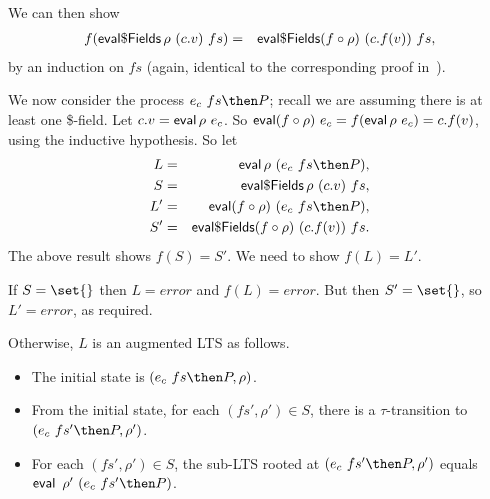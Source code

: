 We can then  show
\begin{eqnarray*} %
f (\evalDollarFields \rho~(c.v)~fs) & = & 
  \evalDollarFields (f\after\rho)~(c.f(v))~fs ,
\end{eqnarray*}
%
by an induction on $fs$ (again, identical to the corresponding proof
in~\cite{symmetry-reduction}).

We now consider the process $e_c~ fs \then P$; recall we are assuming there is
at least one \$-field.  Let $c.v = \mathop{\sf eval} \rho~e_c$.  So $\mathop{\sf eval}
(f\circ\rho)~e_c = f (\mathop{\sf eval} \rho~e_c) = c.f(v)$, using the inductive
hypothesis.  So let
\begin{eqnarray*}
L & = & \eval \rho ~ (e_c~fs \then P), \\
S & = & \evalDollarFields \rho ~(c.v)~ fs, \\
L' & = & \eval (f\after\rho)~ (e_c~fs \then P), \\
S' & = & \evalDollarFields (f\after\rho) ~(c.f(v)) ~fs .
\end{eqnarray*}%
%
The above result shows
$f(S) =  S'$.
We need to show $f(L) = L'$.

If $S = \set{}$ then $L = error$ and $f(L) = error$.  But then $S' =
\set{}$, so $L' = error$, as required. 

Otherwise, $L$ is an augmented LTS as follows.
\begin{itemize}
\item The initial state is $(e_c~fs \then P, \rho)$.

\item From the initial state, for each $(fs',\rho') \in S$, there is a
  $\tau$-transition to $(e_c~fs' \then P, \rho')$.

\item For each $(fs',\rho') \in S$, the sub-LTS rooted at
  $(e_c~fs' \then P, \rho')$ equals $\eval~\rho'~(e_c~fs' \then P)$.
\end{itemize}

